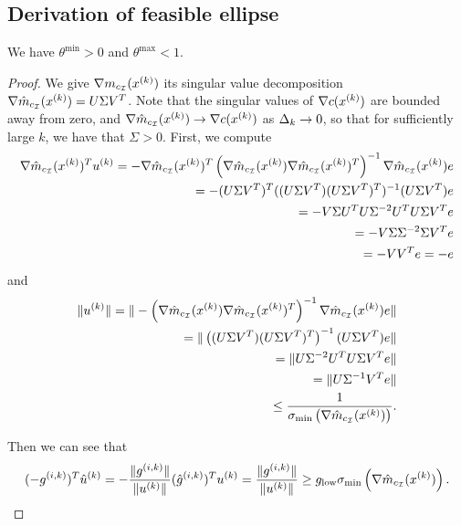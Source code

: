 
\subsection{Derivation of feasible ellipse}


\begin{theorem}
We have $\theta^{\text{min}} > 0$ and $\theta^{\text{max}} < 1$.
\end{theorem}

\begin{proof}
We give $\nabla m_{c_{\mathcal I} }({x^{(k)}})$ its singular value decomposition $\nabla \hat m_{c_{\mathcal I} }({x^{(k)}}) = U\Sigma V^T$.
Note that the singular values of $\nabla c({x^{(k)}})$ are bounded away from zero, and $ \nabla \hat m_{c_{\mathcal I} }({x^{(k)}}) \to \nabla c({x^{(k)}})$ as $\Delta_k\to 0$,
so that for sufficiently large $k$, we have that $\Sigma > 0$.
First, we compute
\begin{align*}
\nabla \hat m_{c_{\mathcal I} }({x^{(k)}})^T {u^{(k)}} = -\nabla\hat m_{c_{\mathcal I} }({x^{(k)}})^T\left(\nabla \hat m_{c_{\mathcal I}}({x^{(k)}})\nabla \hat m_{c_{\mathcal I}}({x^{(k)}})^T\right)^{-1} \nabla \hat m_{c_{\mathcal I}}({x^{(k)}}) e\\
= -(U\Sigma V^T)^T((U\Sigma V^T)(U\Sigma V^T)^T)^{-1}(U\Sigma V^T)e \\
= -V\Sigma U^TU\Sigma^{-2} U^TU\Sigma V^Te \\
= -V\Sigma \Sigma^{-2} \Sigma V^Te \\
= -V V^Te = -e
\end{align*}
and
\begin{align*}
\|{u^{(k)}}\| = \|-\left(\nabla \hat m_{c_{\mathcal I}}({x^{(k)}})\nabla \hat m_{c_{\mathcal I}}({x^{(k)}})^T\right)^{-1} \nabla \hat m_{c_{\mathcal I}}({x^{(k)}}) e\|\\
=\|\left((U\Sigma V^T)(U\Sigma V^T)^T\right)^{-1}(U\Sigma V^T)e\| \\
=\|U\Sigma^{-2} U^TU\Sigma V^Te \| \\
=\|U\Sigma^{-1} V^Te\|  \\
\le \frac 1 {\sigma_{\text{min}}\left(\nabla \hat m_{c_{\mathcal I}}({x^{(k)}})\right)}.
\end{align*}

Then we can see that
\begin{align*}
(-{g^{(i, k)}})^T{{\hat u}^{(k)}} = -\frac{\|{g^{(i, k)}}\|}{\|{u^{(k)}}\|}({{\hat g}^{(i, k)}})^T{u^{(k)}} = \frac{\|{g^{(i, k)}}\|}{\|{u^{(k)}}\|} \ge g_{\text{low}} \sigma_{\text{min}}\left(\nabla \hat m_{c_{\mathcal I}}({x^{(k)}})\right). \\
\end{align*}



\end{proof}




